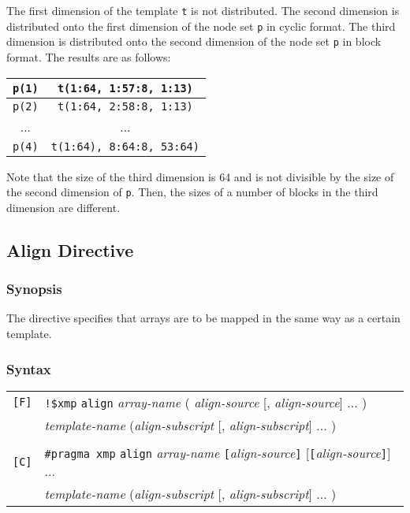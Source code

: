 \begin{description}
The first dimension of the template {\tt t} is not distributed. The
second dimension is distributed onto the first dimension of the node set
{\tt p} in cyclic format. The third dimension is distributed onto the
second dimension of the node set {\tt p} in block format. The results
are as follows:

\begin{center}
\begin{tabular}{|c|c|}
\hline
{\tt p(1)} & {\tt t(1:64, 1:57:8, 1:13)} \\
\hline
{\tt p(2)} & {\tt t(1:64, 2:58:8, 1:13)} \\
\hline
... & ... \\
\hline
{\tt p(4)} & {\tt t(1:64), 8:64:8, 53:64)} \\
\hline
\end{tabular}
\end{center}

Note that the size of the third dimension is 64 and is not divisible by
the size of the second dimension of {\tt p}. Then, the sizes of a number
of blocks in the third dimension are different.

\end{description}

\subsection{Align Directive}

\subsubsection*{Synopsis}
The {\tt {}} directive specifies that arrays are to be
mapped in the same way as a certain template.

\subsubsection*{Syntax}

\begin{tabular}{ll}
\verb![F]! & \verb|!$xmp| {\tt align} {\it array-name}
( {\it align-source} [, {\it align-source}] ... ) \\
 & \hspace{3cm}{\tt with} {\it template-name}
({\it align-subscript} [, {\it align-subscript}] ... ) \\
 & \\
\verb![C]! & \verb|#pragma xmp| {\tt align} {\it array-name} 
{\tt [}{\it align-source}{\tt ]} [{\tt [}{\it align-source}{\tt ]}] ... \\
 & \hspace{3cm}{\tt with} {\it template-name}
({\it align-subscript} [, {\it align-subscript}] ... ) \\
\end{tabular}
\vspace{0.3cm}

